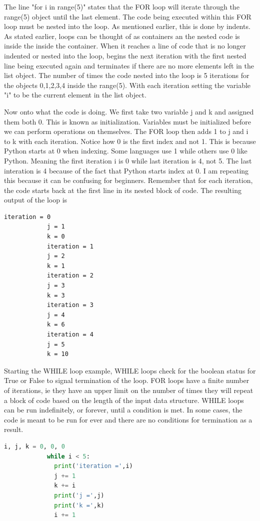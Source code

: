 \documentclass[11pt,a4paper]{book}
\begin{document}
			The line "for i in range(5)" states that the FOR loop will iterate through the range(5) object until the last element. The code being executed within this FOR loop must be nested into the loop. As mentioned earlier, this is done by indents. As stated earlier, loops can be thought of as containers an the nested code is inside the inside the container. When it reaches a line of code that is no longer indented or nested into the loop, begins the next iteration with the first nested line being executed again and terminates if there are no more elements left in the list object. The number of times the code nested into the loop is 5 iterations for the objects 0,1,2,3,4 inside the range(5). With each iteration setting the variable "i" to be the current element in the list object. 
			
			Now onto what the code is doing. We first take two variable j and k and assigned them both 0. This is known as initialization. Variables must be initialized before we can perform operations on themselves. The FOR loop then adds 1 to j and i to k with each iteration. Notice how 0 is the first index and not 1. This is because Python starts at 0 when indexing. Some languages use 1 while others use 0 like Python. Meaning the first iteration i is 0 while last iteration is 4, not 5. The last interation is 4 because of the fact that Python starts index at 0. I am repeating this because it can be confusing for beginners. 
			Remember that for each iteration, the code starts back at the first line in its nested block of code. The resulting output of the loop is
			\begin{lstlisting}[caption=For loop output]
			iteration = 0
			j = 1
			k = 0
			iteration = 1
			j = 2
			k = 1
			iteration = 2
			j = 3
			k = 3
			iteration = 3
			j = 4
			k = 6
			iteration = 4
			j = 5
			k = 10
			\end{lstlisting}
			
			Starting the WHILE loop example, WHILE loops check for the boolean status for True or False to signal termination of the loop. FOR loops have a finite number of iterations, ie they have an upper limit on the number of times they will repeat a block of code based on the length of the input data structure. WHILE loops can be run indefinitely, or forever, until a condition is met. In some cases, the code is meant to be run for ever and there are no conditions for termination as a result.
			
			\begin{lstlisting}[language=Python, caption = While loop example]
			i, j, k = 0, 0, 0
			while i < 5:
			  print('iteration =',i)
		      j += 1
			  k += i
			  print('j =',j)
			  print('k =',k)
			  i += 1
			\end{lstlisting}
			
\end{document}
